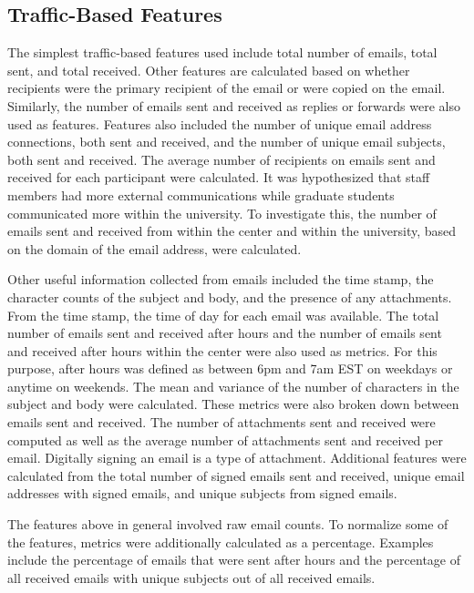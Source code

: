 \documentclass{article}
\begin{document}
\subsection{Traffic-Based Features}
The simplest traffic-based features used include total number of emails, total sent, and total received.  Other features are calculated based on whether recipients were the primary recipient of the email or were copied on the email.  Similarly, the number of emails sent and received as replies or forwards were also used as features.  Features also included the number of unique email address connections, both sent and received,  and the number of unique email subjects, both sent and received.  The average number of recipients on emails sent and received for each participant were calculated.  It was hypothesized that staff members had more external communications while graduate students communicated more within the university.  To investigate this, the number of emails sent and received from within the center and within the university, based on the domain of the email address, were calculated.  

Other useful information collected from emails included the time stamp, the character counts of the subject and body, and the presence of any attachments. From the time stamp, the time of day for each email was available.  The total number of emails sent and received after hours and the number of emails sent and received after hours within the center were also used as metrics.  For this purpose, after hours was defined as between 6pm and 7am EST on weekdays or anytime on weekends.  The mean and variance of the number of characters in the subject and body were calculated.  These metrics were also broken down between emails sent and received.  The number of attachments sent and received were computed as well as the average number of attachments sent and received per email.  Digitally signing an email is a type of attachment.  Additional features were calculated from the total number of signed emails sent and received, unique email addresses with signed emails, and unique subjects from signed emails.

The features above in general involved raw email counts.  To normalize some of the features, metrics were additionally calculated as a percentage. Examples include the percentage of emails that were sent after hours and the percentage of all received emails with unique subjects out of all received emails.
\end{document}
